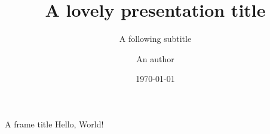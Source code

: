 \documentclass[aspectratio=169]{beamer}
\author{An author}
\title{A lovely presentation title}
\subtitle{A following subtitle}
\date{\today}
\begin{document}
\begin{frame}
\titlepage
\end{frame}

\begin{frame}{A frame title}
Hello, World!
\end{frame}
\end{document}
